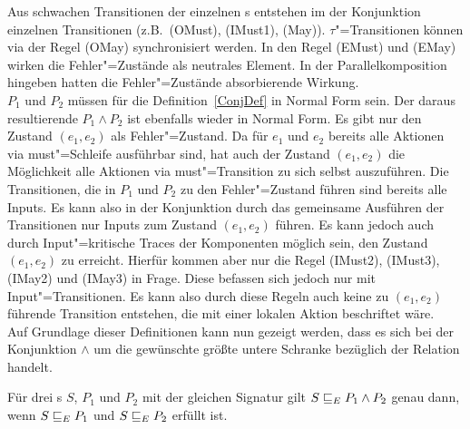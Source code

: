 Aus schwachen Transitionen der einzelnen \MEIO{}s entstehen im der Konjunktion
einzelnen Transitionen (z.B.\ (OMust), (IMust1), (May)). $\tau$"=Transitionen
können via der Regel (OMay) synchronisiert werden. In den Regel (EMust) und
(EMay) wirken die Fehler"=Zustände als neutrales Element. In der
Parallelkomposition hingeben hatten die Fehler"=Zustände absorbierende
Wirkung.\\
$P_1$ und $P_2$ müssen für die Definition~\ref{ConjDef} in Normal Form sein.
Der daraus resultierende \MEIO{} $P_1\land P_2$ ist ebenfalls wieder in Normal
Form. Es gibt nur den Zustand $(e_1,e_2)$ als Fehler"=Zustand. Da für $e_1$ und
$e_2$ bereits alle Aktionen via must"=Schleife ausführbar sind, hat auch der
Zustand $(e_1,e_2)$ die Möglichkeit alle Aktionen via must"=Transition zu sich
selbst auszuführen. Die Transitionen, die in $P_1$ und $P_2$ zu den
Fehler"=Zustand führen sind bereits alle Inputs. Es kann also in der
Konjunktion durch das gemeinsame Ausführen der Transitionen nur Inputs zum
Zustand $(e_1,e_2)$ führen. Es kann jedoch auch durch Input"=kritische Traces
der Komponenten möglich sein, den Zustand $(e_1,e_2)$ zu erreicht. Hierfür
kommen aber nur die Regel (IMust2), (IMust3), (IMay2) und (IMay3) in Frage.
Diese befassen sich jedoch nur mit Input"=Transitionen. Es kann also durch
diese Regeln auch keine zu $(e_1,e_2)$ führende Transition entstehen, die mit
einer lokalen Aktion beschriftet wäre.\\
Auf Grundlage dieser Definitionen kann nun gezeigt werden, dass es sich bei der
Konjunktion $\land$ um die gewünschte größte untere Schranke bezüglich der
Relation \ERel{} handelt.

\begin{Satz}[Konjunktion]
  Für drei \MEIO{}s $S$, $P_1$ und $P_2$ mit der gleichen Signatur gilt
  $S \sqsubseteq  _E P_1\land P_2$ genau dann, wenn $S \sqsubseteq  _E P_1$ und $S \sqsubseteq  _E P_2$ erfüllt
  ist.
\end{Satz}

